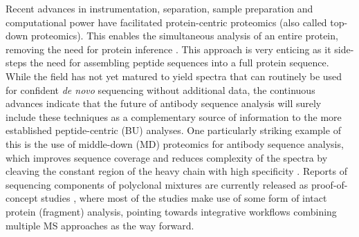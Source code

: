 Recent advances in instrumentation, separation, sample preparation and computational power have facilitated protein-centric proteomics (also called top-down proteomics). This enables the simultaneous analysis of an entire protein, removing the need for protein inference \cite{toby2016progress}. This approach is very enticing as it side-steps the need for assembling peptide sequences into a full protein sequence. While the field has not yet matured to yield spectra that can routinely be used for confident \emph{de novo} sequencing without additional data, the continuous advances indicate that the future of antibody sequence analysis will surely include these techniques as a complementary source of information to the more established peptide-centric (BU) analyses. One particularly striking example of this is the use of middle-down (MD) proteomics for antibody sequence analysis, which improves sequence coverage and reduces complexity of the spectra by cleaving the constant region of the heavy chain with high specificity \cite{johansson2008ides:}. Reports of sequencing components of polyclonal mixtures are currently released as proof-of-concept studies \cite{bondt2021human, dupré2021de, schulte2022template-based}, where most of the studies make use of some form of intact protein (fragment) analysis, pointing towards integrative workflows combining multiple MS approaches as the way forward.
